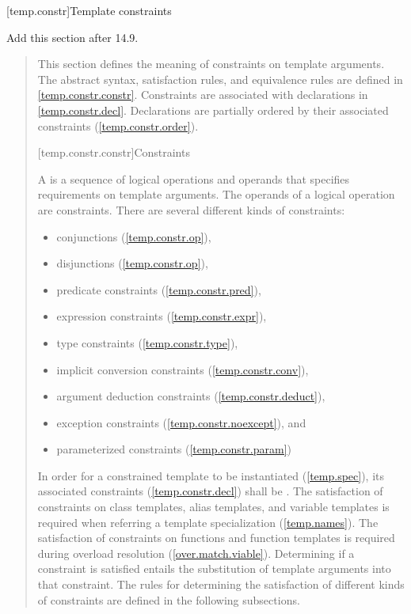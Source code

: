 
[temp.constr]{Template constraints}

Add this section after 14.9.

\begin{quote}

\pnum
\enternote
This section defines the meaning of constraints on template arguments.
% 
The abstract syntax, satisfaction rules, and equivalence rules are defined
in \ref{temp.constr.constr}. 
% 
Constraints are associated with declarations in \ref{temp.constr.decl}.
% 
Declarations are partially ordered by their associated constraints 
(\ref{temp.constr.order}).
\exitnote


[temp.constr.constr]{Constraints}

\pnum
A  is a sequence of logical operations and 
operands that specifies requirements on template arguments.
\enternote The operands of a logical operation are constraints. \exitnote
% 
There are several different kinds of constraints:
\begin{itemize}
\item conjunctions (\ref{temp.constr.op}),
\item disjunctions (\ref{temp.constr.op}),
\item predicate constraints (\ref{temp.constr.pred}),
\item expression constraints (\ref{temp.constr.expr}),
\item type constraints (\ref{temp.constr.type}),
\item implicit conversion constraints (\ref{temp.constr.conv}),
\item argument deduction constraints (\ref{temp.constr.deduct}),
\item exception constraints (\ref{temp.constr.noexcept}), and
\item parameterized constraints (\ref{temp.constr.param})
\end{itemize}

\pnum
In order for a constrained template to be instantiated (\ref{temp.spec}), its 
associated constraints (\ref{temp.constr.decl}) shall be .
% 
\enternote
The satisfaction of constraints on class templates, alias templates, 
and variable templates is required when referring a template specialization 
(\ref{temp.names}). The satisfaction of constraints on functions and
function templates is required during overload resolution (\ref{over.match.viable}).
\exitnote
% 
Determining if a constraint is satisfied entails the substitution 
of template arguments into that constraint.
% 
The rules for determining the satisfaction of different kinds of 
constraints are defined in the following subsections.


\end{quote}
